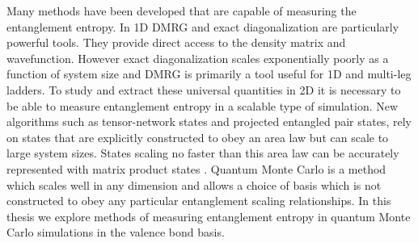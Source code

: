 Many methods have been developed that are capable of measuring the entanglement entropy. In 1D DMRG and exact diagonalization are particularly powerful tools. They provide direct access to the density matrix and wavefunction. However exact diagonalization scales exponentially poorly as a function of system size and DMRG is primarily a tool useful for 1D and multi-leg ladders. To study and extract these universal quantities in 2D it is necessary to be able to measure entanglement entropy in a scalable type of simulation. New algorithms such as tensor-network states and projected entangled pair states, rely on states that are explicitly constructed to obey an area law \cite{MERA,PEPS1,PEPS2} but can scale to large system sizes. States scaling no faster than this area law can be accurately represented with matrix product states \cite{MPS_DMRG}. Quantum Monte Carlo is a method which scales well in any dimension and allows a choice of basis which is not constructed to obey any particular entanglement scaling relationships. In this thesis we explore methods of measuring entanglement entropy in quantum Monte Carlo simulations in the valence bond basis.


